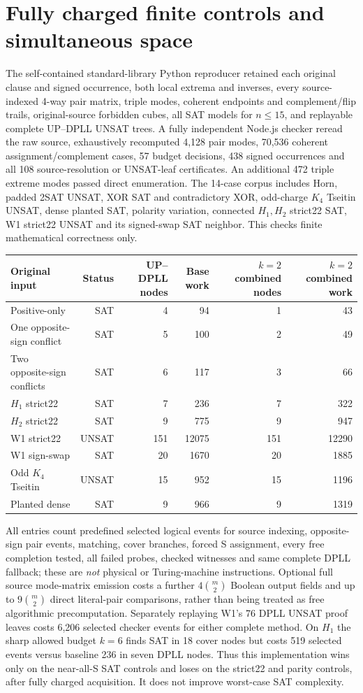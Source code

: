 \documentclass[10pt]{article}
\begin{document}
\section{Fully charged finite controls and simultaneous space}
The self-contained standard-library Python reproducer retained each original clause and signed occurrence, both local extrema and inverses, every source-indexed 4-way pair matrix, triple modes, coherent endpoints and complement/flip trails, original-source forbidden cubes, all SAT models for $n\le15$, and replayable complete UP--DPLL UNSAT trees. A fully independent Node.js checker reread the raw source, exhaustively recomputed 4,128 pair modes, 70,536 coherent assignment/complement cases, 57 budget decisions, 438 signed occurrences and all 108 source-resolution or UNSAT-leaf certificates. An additional 472 triple extreme modes passed direct enumeration. The 14-case corpus includes Horn, padded 2SAT UNSAT, XOR SAT and contradictory XOR, odd-charge $K_4$ Tseitin UNSAT, dense planted SAT, polarity variation, connected $H_1,H_2$ strict22 SAT, W1 strict22 UNSAT and its signed-swap SAT neighbor. This checks finite mathematical correctness only.
\begin{center}\small
\begin{tabular}{lrrrrr}\toprule
Original input & Status & UP--DPLL nodes & Base work & $k=2$ combined nodes & $k=2$ combined work\\\midrule
Positive-only & SAT & 4 & 94 & 1 & 43\\
One opposite-sign conflict & SAT & 5 & 100 & 2 & 49\\
Two opposite-sign conflicts & SAT & 6 & 117 & 3 & 66\\
$H_1$ strict22 & SAT & 7 & 236 & 7 & 322\\
$H_2$ strict22 & SAT & 9 & 775 & 9 & 947\\
W1 strict22 & UNSAT & 151 & 12075 & 151 & 12290\\
W1 sign-swap & SAT & 20 & 1670 & 20 & 1885\\
Odd $K_4$ Tseitin & UNSAT & 15 & 952 & 15 & 1196\\
Planted dense & SAT & 9 & 966 & 9 & 1319\\\bottomrule
\end{tabular}
\end{center}
All entries count predefined selected logical events for source indexing, opposite-sign pair events, matching, cover branches, forced S assignment, every free completion tested, all failed probes, checked witnesses and same complete DPLL fallback; these are \emph{not} physical or Turing-machine instructions. Optional full source mode-matrix emission costs a further $4\binom m2$ Boolean output fields and up to $9\binom m2$ direct literal-pair comparisons, rather than being treated as free algorithmic precomputation. Separately replaying W1's 76 DPLL UNSAT proof leaves costs 6,206 selected checker events for either complete method. On $H_1$ the sharp allowed budget $k=6$ finds SAT in 18 cover nodes but costs 519 selected events versus baseline 236 in seven DPLL nodes. Thus this implementation wins only on the near-all-S SAT controls and loses on the strict22 and parity controls, after fully charged acquisition. It does not improve worst-case SAT complexity.
\end{document}
